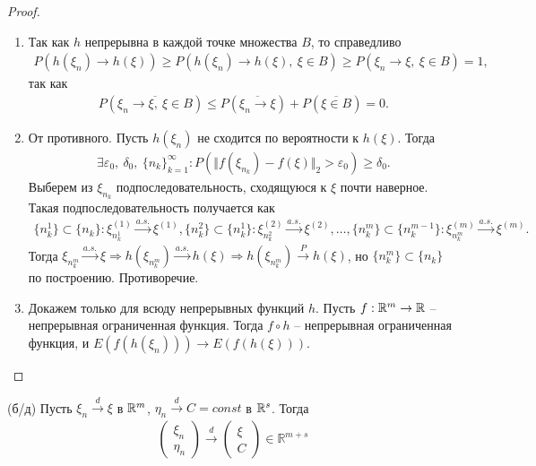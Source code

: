 \begin{proof} ~
	\begin{enumerate}
		\item Так как $h$ непрерывна в каждой точке множества $B$, то справедливо 
		\begin{gather*}
		    P\left(h\left(\xi_n\right) \rightarrow h\left(\xi\right)\right) \ge P\left(h\left(\xi_n\right) \rightarrow h\left(\xi\right),\ \xi \in B\right) \ge P\left(\xi_n \rightarrow \xi,\ \xi \in B\right) = 1,
		\end{gather*}
		так как
		\begin{gather*}
		    P\left(\overline{\xi_n \rightarrow \xi,\ \xi \in B}\right) \le P\left(\overline{\xi_n \rightarrow \xi}\right) + P\left(\overline{\xi \in B}\right) = 0.
		\end{gather*}
		
		\item От противного. Пусть $h\left(\xi_n\right)$ не сходится по вероятности к $h\left(\xi\right)$. Тогда
		\begin{gather*}
		    \exists \varepsilon_0,\ \delta_0,\ \{n_k\}_{k=1}^\infty : P(\Vert f(\xi_{n_k}) - f(\xi)\Vert_2 > \varepsilon_0) \ge \delta_0.
		\end{gather*}
		Выберем из $\xi_{n_k}$ подпоследовательность, сходящуюся к $\xi$ почти наверное. Такая подпоследовательность получается как
		\begin{gather*}
		    \{n_k^1\} \subset \{n_k\}: \xi^{(1)}_{n_k^1} \xrightarrow{a.s.} \xi^{(1)}, \{n_k^2\} \subset \{n_k^1\}: \xi^{(2)}_{n_k^2}\xrightarrow{a.s.} \xi^{(2)},\ldots, \{n_k^m\} \subset \{n_k^{m-1}\}: \xi^{(m)}_{n_k^m}\xrightarrow{a.s.} \xi^{(m)}.
		\end{gather*}
		Тогда $\xi_{n_k^m} \xrightarrow{a.s.} \xi \Rightarrow h(\xi_{n_k^m}) \xrightarrow{a.s.} h(\xi) \Rightarrow h(\xi_{n_k^m}) \xrightarrow{P} h(\xi)$, но $\{n_k^m\} \subset \{n_k\}$ по построению. Противоречие.
		
		\item Докажем только для всюду непрерывных функций $h$. Пусть $f:\mathbb{R}^m\rightarrow\mathbb{R}$ -- непрерывная ограниченная функция. Тогда $f \circ h$ -- непрерывная ограниченная функция, и $E\left(f\left(h\left(\xi_n\right)\right)\right) \rightarrow E\left(f \left( h\left( \xi\right) \right) \right).$
	\end{enumerate}
\end{proof}

\begin{proposition}
	(б/д) Пусть $\xi_n \xrightarrow{d} \xi$ в $\mathbb{R}^m$, $\eta_n \xrightarrow{d} C = const$ в $\mathbb{R}^s$. Тогда
	\begin{gather*}
	    \begin{pmatrix}
		\xi _{n}\\
		\eta _{n}
    	\end{pmatrix}\xrightarrow{d}
    	\begin{pmatrix}
    		\xi \\
    		C
    	\end{pmatrix} \in \mathbb{R}^{m+s}
	\end{gather*}
\end{proposition}


